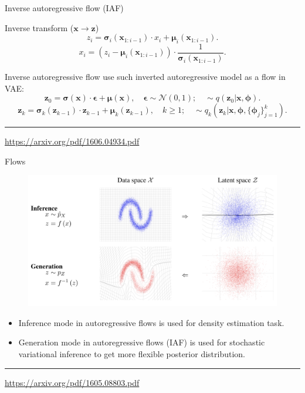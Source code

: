 \documentclass{beamer}
\newcommand{\bx}{\mathbf{x}}
\newcommand{\bz}{\mathbf{z}}
\newcommand{\bepsilon}{\boldsymbol{\epsilon}}
\newcommand{\bmu}{\boldsymbol{\mu}}
\newcommand{\bsigma}{\boldsymbol{\sigma}}
\newcommand{\bphi}{\boldsymbol{\phi}}
\begin{document}
\begin{frame}{Inverse autoregressive flow (IAF)}
	
	\begin{block}{Inverse transform ($\bx \rightarrow \bz$)}
		\vspace{-0.2cm}
		\[
			z_i = \bsigma_i (\bx_{1:i-1}) \cdot x_i + \bmu_i(\bx_{1:i-1}).
		\]
		\[
			x_i = \left( z_i - \bmu_i(\bx_{1:i-1})\right) \cdot \frac{1}{\bsigma_i (\bx_{1:i-1})}.
		\]
		\vspace{-0.3cm}
	\end{block}
	Inverse autoregressive flow use such inverted autoregressive model as a flow in VAE:
	\[
		\bz_0 = \bsigma(\bx) \cdot \bepsilon + \bmu(\bx), \quad \bepsilon \sim \mathcal{N}(0, 1); \quad  \sim q(\bz_0 | \bx, \bphi).
	\]
	\[
		\bz_k = \bsigma_k(\bz_{k - 1}) \cdot \bz_{k-1} + \bmu_k(\bz_{k - 1}), \quad k \geq 1; \quad  \sim q_k(\bz_k | \bx, \bphi, \{\bphi_j\}_{j=1}^k).
	\]
	\vfill
	\hrule\medskip
	{\scriptsize \href{https://arxiv.org/pdf/1606.04934.pdf}{https://arxiv.org/pdf/1606.04934.pdf}} 
\end{frame}
\begin{frame}{Flows}
\begin{figure}
	\includegraphics[width=0.8\linewidth]{figs/flows_how2.png}
\end{figure}
\begin{itemize}	
	\item Inference mode in autoregressive flows is used for density estimation task.
	\item Generation mode in autoregressive flows (IAF) is used for stochastic variational inference to get more flexible posterior distribution.
\end{itemize}
\vfill
\hrule\medskip
{\scriptsize \href{https://arxiv.org/pdf/1605.08803.pdf}{https://arxiv.org/pdf/1605.08803.pdf}} 
\end{frame}
\end{document}
